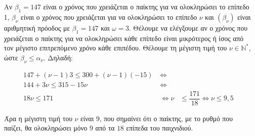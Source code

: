 \begin{alist}
\item Αν $\beta_1 = 147$ είναι ο χρόνος που χρειάζεται ο παίκτης για να ολοκληρώσει το επίπεδο 1, $\beta_\nu$ είναι ο χρόνος που χρειάζεται για να ολοκληρώσει το επίπεδο $\nu$ και $(\beta_\nu)$ είναι αριθμητική πρόοδος με $\beta_1 = 147$ και $\omega = 3$. Θέλουμε να ελέγξουμε αν ο χρόνος που χρειάζεται ο παίκτης για να ολοκληρώσει κάθε επίπεδο είναι μικρότερος ή ίσος από τον μέγιστο επιτρεπόμενο χρόνο κάθε επιπέδου.
Θέλουμε τη μέγιστη τιμή του $\nu \in \mathbb{N}^*$, ώστε $\beta_\nu \le \alpha_\nu$. Δηλαδή:

\begin{align*}
147 + (\nu - 1)3 \le 300 + (\nu - 1)(-15) \ &\Leftrightarrow \\
144 + 3\nu \le 315 - 15\nu \ &\Leftrightarrow \\
18\nu \le 171 \ &\Leftrightarrow \nu &\le \dfrac{171}{18} \Leftrightarrow \nu \le 9,5
\end{align*}

Άρα η μέγιστη τιμή του $\nu$ είναι $9$, που σημαίνει ότι ο παίκτης, με το ρυθμό που παίζει, θα ολοκληρώσει μόνο $9$ από τα $18$ επίπεδα του παιχνιδιού.
\end{alist}

